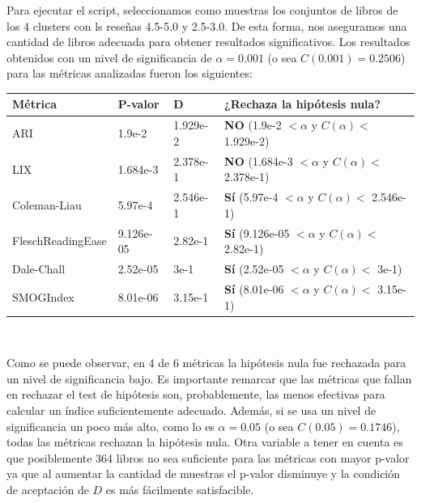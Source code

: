 \documentclass[12pt,journal,compsoc]{IEEEtran}
\begin{document}
Para ejecutar el script, seleccionamos como muestras los conjuntos de libros de los 4 clusters con ls reseñas 4.5-5.0 y 2.5-3.0. De esta forma, nos aseguramos una cantidad de libros adecuada para obtener resultados significativos. Los resultados obtenidos con un nivel de significancia de $\alpha = 0.001$ (o sea $C(0.001) = 0.2506$) para las métricas analizadas fueron los siguientes:\\
\begin{center}
  \centering
  \begin{tabular}{ | l | l | l | l | }
  \hline
  Métrica & P-valor & D & ¿Rechaza la hipótesis nula?\\
  \hline
  ARI & 1.9e-2 & 1.929e-2 & \textbf{NO} (1.9e-2 $< \alpha$ y $C(\alpha) <$ 1.929e-2)\\
  \hline
  LIX & 1.684e-3 & 2.378e-1 & \textbf{NO} (1.684e-3 $< \alpha$ y $C(\alpha) <$ 2.378e-1)\\
  \hline
  Coleman-Liau & 5.97e-4 & 2.546e-1 & \textbf{Sí} (5.97e-4 $< \alpha$ y $C(\alpha) <$ 2.546e-1)\\
  \hline
  FleschReadingEase & 9.126e-05 & 2.82e-1 & \textbf{Sí} (9.126e-05 $< \alpha$ y $C(\alpha) <$ 2.82e-1)\\
  \hline
  Dale-Chall & 2.52e-05 & 3e-1 & \textbf{Sí} (2.52e-05 $< \alpha$ y $C(\alpha) <$ 3e-1)\\
  \hline
  SMOGIndex & 8.01e-06 & 3.15e-1 & \textbf{Sí} (8.01e-06 $< \alpha$ y $C(\alpha) <$ 3.15e-1)\\
  \hline
  \end{tabular}
\end{center}

~

Como se puede observar, en 4 de 6 métricas la hipótesis nula fue rechazada para un nivel de significancia bajo. Es importante remarcar que las métricas que fallan en rechazar el test de hipótesis son, probablemente, las menos efectivas para calcular un índice suficientemente adecuado. Además, si se usa un nivel de significancia un poco más alto, como lo es $\alpha = 0.05$ (o sea $C(0.05) = 0.1746$), todas las métricas rechazan la hipótesis nula. Otra variable a tener en cuenta es que posiblemente 364 libros no sea suficiente para las métricas con mayor p-valor ya que al aumentar la cantidad de muestras el p-valor disminuye y la condición de aceptación de $D$ es más fácilmente satisfacible.

\end{document}

